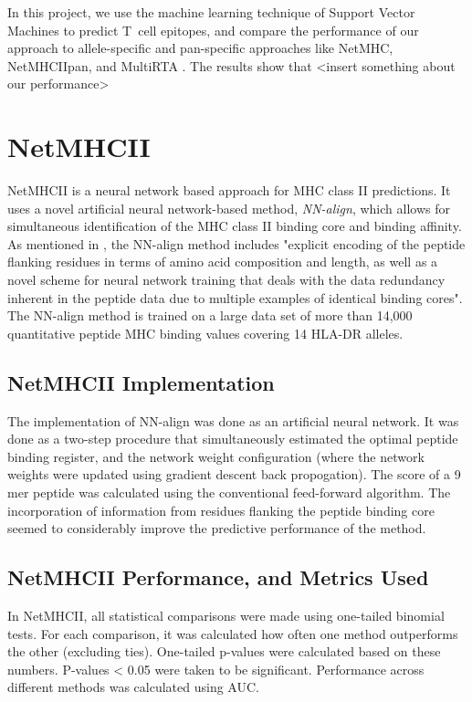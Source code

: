 \documentclass[journal]{IEEEtran}
\begin{document}
In this project, we use the machine learning technique of Support Vector Machines to predict T~cell epitopes, and compare the performance of our approach to allele-specific and pan-specific approaches like NetMHC, NetMHCIIpan, and MultiRTA \cite{MultiRTA}. The results show that <insert something about our performance>


\section{NetMHCII}
NetMHCII is a neural network based approach for MHC class II predictions. It uses a novel artificial neural network-based method, \textit{NN-align}, which allows for simultaneous identification of the MHC class II binding core and binding affinity. As mentioned in \cite{NetMHCII}, the NN-align method includes "explicit encoding of the peptide flanking residues in terms of amino acid composition and length, as well as a novel scheme for neural network training that deals with the data redundancy inherent in the peptide data due to multiple examples of identical binding cores". The NN-align method is trained on a large data set of more than 14,000 quantitative peptide MHC binding values covering 14 HLA-DR alleles.

\subsection{NetMHCII Implementation}
The implementation of NN-align was done as an artificial neural network. It was done as a two-step procedure that simultaneously estimated the optimal peptide binding register, and the network weight configuration (where the network weights were updated using gradient descent back propogation). The score of a 9 mer peptide was calculated using the conventional feed-forward algorithm. The incorporation of information from residues flanking the peptide binding core seemed to considerably improve the predictive performance of the method. 



\subsection{NetMHCII Performance, and Metrics Used}
In NetMHCII, all statistical comparisons were made using one-tailed binomial tests. For each comparison, it was calculated how often one method outperforms the other (excluding ties). One-tailed p-values were calculated based on these numbers. P-values < 0.05 were taken to be significant. Performance across different methods was calculated using AUC.
\end{document}
